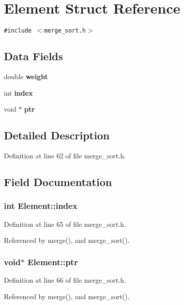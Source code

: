 \section{Element Struct Reference}
\label{structElement}
{\tt \#include $<$merge\_\-sort.h$>$}

\subsection*{Data Fields}
\begin{CompactItemize}
\item 
double \bf{weight}
\item 
int \bf{index}
\item 
void $\ast$ \bf{ptr}
\end{CompactItemize}


\subsection{Detailed Description}




Definition at line 62 of file merge\_\-sort.h.

\subsection{Field Documentation}
\subsubsection{\setlength{\rightskip}{0pt plus 5cm}int \bf{Element::index}}\label{structElement_b948db1cfdfddb28e356381628aa1298}




Definition at line 65 of file merge\_\-sort.h.

Referenced by merge(), and merge\_\-sort().
\subsubsection{\setlength{\rightskip}{0pt plus 5cm}void$\ast$ \bf{Element::ptr}}\label{structElement_91754c4faf72d2b81e4d1334a55216f3}




Definition at line 66 of file merge\_\-sort.h.

Referenced by merge(), and merge\_\-sort().
